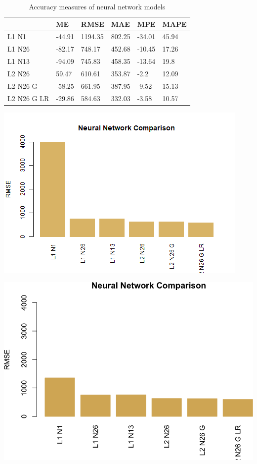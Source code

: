\documentclass[
  paper=a4,
  ,captions=tableheading
]{scrartcl}
\begin{document}
\begin{table}[!h]

\caption{\label{tab:NN Summary}Accuracy measures of neural network models}
\centering
\begin{tabu} to 
\hline
  & ME & RMSE & MAE & MPE & MAPE\\
\hline
L1 N1 & -44.91 & 1194.35 & 802.25 & -34.01 & 45.94\\
\hline
L1 N26 & -82.17 & 748.17 & 452.68 & -10.45 & 17.26\\
\hline
L1 N13 & -94.09 & 745.83 & 458.35 & -13.64 & 19.8\\
\hline
L2 N26 & 59.47 & 610.61 & 353.87 & -2.2 & 12.09\\
\hline
L2 N26 G & -58.25 & 661.95 & 387.95 & -9.52 & 15.13\\
\hline
L2 N26 G LR & -29.86 & 584.63 & 332.03 & -3.58 & 10.57\\
\hline
\end{tabu}
\end{table}

\begin{center}\includegraphics{Diamonds_PDF_files/figure-latex/NN Summary-1} \end{center}

\begin{center}\includegraphics{Diamonds_PDF_files/figure-latex/NN Summary-2} \end{center}
\end{document}

